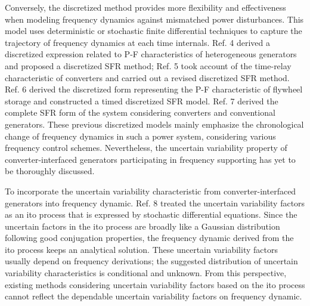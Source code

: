 \documentclass[lettersize,journal]{IEEEtran}
\begin{document}
Conversely, the discretized method provides more flexibility and effectiveness when modeling frequency dynamics against mismatched power disturbances.
This model uses deterministic or stochastic finite differential techniques to capture the trajectory of frequency dynamics at each time internals. Ref. 4 derived a discretized expression related to P-F characteristics of heterogeneous generators and proposed a discretized SFR method; Ref. 5 took account of the time-relay characteristic of converters and carried out a revised discretized SFR method. Ref. 6 derived the discretized form representing the P-F characteristic of flywheel storage and constructed a timed discretized SFR model. Ref. 7 derived the complete SFR form of the system considering converters and conventional generators. These previous discretized models mainly emphasize the chronological change of frequency dynamics in such a power system, considering various frequency control schemes. Nevertheless, the uncertain variability property of converter-interfaced generators participating in frequency supporting has yet to be thoroughly discussed.

To incorporate the uncertain variability characteristic from converter-interfaced generators into frequency dynamic. Ref. 8 treated the uncertain variability factors as an ito process that is expressed by stochastic differential equations. Since the uncertain factors in the ito process are broadly like a Gaussian distribution following good conjugation properties, the frequency dynamic derived from the ito process keeps an analytical solution. These uncertain variability factors usually depend on frequency derivations; the suggested distribution of uncertain variability characteristics is conditional and unknown. From this perspective, existing methods considering uncertain variability factors based on the ito process cannot reflect the dependable uncertain variability factors on frequency dynamic.
\end{document}
